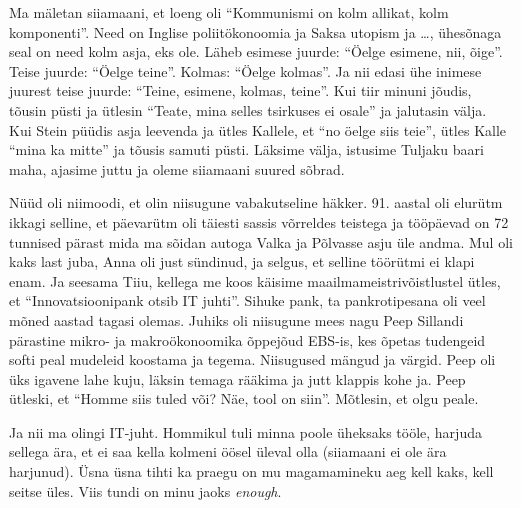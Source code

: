 Ma mäletan siiamaani, et loeng oli \enquote{Kommunismi on kolm allikat, kolm 
komponenti}. Need on Inglise poliitökonoomia ja Saksa utopism ja \ldots, 
ühesõnaga seal on need kolm asja, eks ole.  Läheb esimese juurde: 
\enquote{Öelge esimene, nii, õige}. Teise juurde: \enquote{Öelge teine}. 
Kolmas: \enquote{Öelge kolmas}. Ja nii edasi ühe inimese juurest teise juurde: 
\enquote{Teine, esimene, kolmas, teine}. Kui tiir minuni jõudis, tõusin püsti 
ja ütlesin \enquote{Teate, mina selles tsirkuses ei osale} ja jalutasin välja. 
Kui Stein püüdis asja leevenda ja ütles Kallele, et \enquote{no öelge siis 
teie}, ütles Kalle \enquote{mina ka mitte} ja tõusis samuti püsti. Läksime 
välja, istusime Tuljaku baari maha, ajasime juttu ja oleme siiamaani suured 
sõbrad.


Nüüd oli niimoodi, et olin niisugune vabakutseline häkker. 91. aastal oli 
elurütm ikkagi selline, et päevarütm oli täiesti sassis võrreldes teistega ja 
tööpäevad on 72 tunnised pärast mida ma sõidan autoga Valka ja Põlvasse asju 
üle andma. Mul oli kaks last juba, Anna oli just sündinud, ja selgus, et 
selline töörütmi ei klapi enam. Ja seesama Tiiu, 
kellega me koos käisime maailmameistrivõistlustel ütles, et 
\enquote{Innovatsioonipank otsib IT juhti}. Sihuke pank, ta pankrotipesana oli veel mõned aastad 
tagasi olemas. Juhiks oli niisugune mees  nagu Peep 
Sillandi pärastine mikro- ja makroökonoomika 
õppejõud EBS-is, kes õpetas tudengeid softi peal mudeleid koostama ja tegema. 
Niisugused mängud ja värgid. Peep oli üks igavene lahe kuju, läksin temaga 
rääkima ja jutt klappis kohe ja. Peep ütleski, et \enquote{Homme siis tuled 
või? Näe, tool on siin}. Mõtlesin, et olgu peale. 

Ja nii ma olingi IT-juht. Hommikul tuli minna poole üheksaks tööle, harjuda 
sellega ära, et ei saa kella kolmeni öösel üleval olla (siiamaani ei ole ära 
harjunud). Üsna üsna tihti ka praegu on mu magamamineku aeg kell kaks, kell 
seitse üles. Viis tundi on minu jaoks \emph{enough}. 

